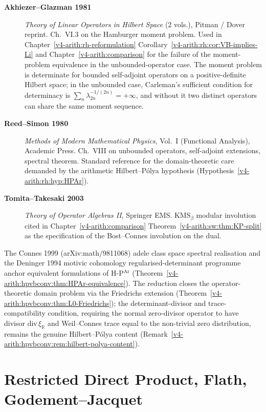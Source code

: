 \begin{description}
\item[\textbf{Akhiezer--Glazman 1981}] \emph{Theory of Linear
Operators in Hilbert Space} (2 vols.), Pitman / Dover reprint.
Ch.~VI.3 on the Hamburger moment problem. Used in
Chapter~\ref{v4-arith:rh-reformulation}
Corollary~\ref{v4-arith:rh:cor:VB-implies-Li} and
Chapter~\ref{v4-arith:comparison} for the failure of the moment-problem
equivalence in the unbounded-operator case. The moment problem is
determinate for bounded self-adjoint operators on a
positive-definite Hilbert space; in the unbounded case, Carleman's
sufficient condition for determinacy is
\(\sum_{n}\lambda_{2n}^{-1/(2n)}=+\infty\), and without it two
distinct operators can share the same moment sequence.
\item[\textbf{Reed--Simon 1980}] \emph{Methods of Modern
Mathematical Physics}, Vol.~I (Functional Analysis), Academic Press.
Ch.~VIII on unbounded operators, self-adjoint extensions,
spectral theorem. Standard reference for the domain-theoretic
care demanded by the arithmetic Hilbert--P\'olya hypothesis
(Hypothesis~\ref{v4-arith:rh:hyp:HPAr}).
\item[\textbf{Tomita--Takesaki 2003}] \emph{Theory of Operator
Algebras II}, Springer EMS. KMS\({}_{\beta}\) modular involution
cited in Chapter~\ref{v4-arith:comparison}
Theorem~\ref{v4-arith:sw:thm:KP-split} as the specification of the
Bost--Connes involution on the dual.
\end{description}

The Connes 1999 (arXiv:math/9811068) adele class space spectral
realisation and the Deninger 1994 motivic cohomology
regularised-determinant programme anchor equivalent formulations of
H-P\(^{\mathrm{Ar}}\)
(Theorem~\ref{v4-arith:hpvbconv:thm:HPAr-equivalence}). The reduction
closes the operator-theoretic domain problem via the Friedrichs
extension (Theorem~\ref{v4-arith:hpvbconv:thm:L0-Friedrichs}); the
determinant-divisor and trace-compatibility condition, requiring the
normal zero-divisor operator to have divisor \(\mathrm{div}\,\xi_{\mathbb R}\)
and Weil--Connes trace equal to the non-trivial zero distribution,
remains the genuine Hilbert--P\'olya content
(Remark~\ref{v4-arith:hpvbconv:rem:hilbert-polya-content}).

\section{Restricted Direct Product, Flath, Godement--Jacquet}
\label{v4-arith:app:A:restricted-tensor}

